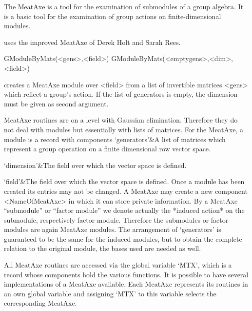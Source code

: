 

The MeatAxe \cite{Par84} is a tool for the examination of submodules of a
group algebra. It is a basic tool for the examination of group actions on
finite-dimensional modules.

{\GAP} uses the improved MeatAxe of Derek Holt and Sarah Rees.


\>GModuleByMats(<gens>,<field>)
\>GModuleByMats(<emptygens>,<dim>,<field>)

creates a MeatAxe module over <field> from a list of invertible matrices 
<gens> which reflect a group's action. If the list of generators is empty,
the dimension must be given as second argument.

MeatAxe routines are on a level with Gaussian elimination. Therefore they do
not deal with {\GAP} modules but essentially with lists of matrices. For the
MeatAxe, a module is a record with components
\beginitems
`generators'&A list of matrices which represent a group operation on a
finite dimensional row vector space.

`dimension'&The field over which the vector space is defined.

`field'&The field over which the vector space is defined.
\enditems
Once a module has been created its entries may not be changed. A MeatAxe may
create a new component <NameOfMeatAxe> in which it can store private
information. By a MeatAxe ``submodule'' or ``factor module'' we denote
actually the *induced action* on the submodule, respectively factor module.
Therefore the submodules or factor modules are again MeatAxe modules. The
arrangement of `generators' is guaranteed to be the same for the induced
modules, but to obtain the complete relation to the original module, the
bases used are needed as well.


All MeatAxe routines are accessed via the global variable `MTX', which is a
record whose components hold the various functions. It is possible to have
several implementations of a MeatAxe available. Each MeatAxe represents its
routines in an own global variable and assigning `MTX' to this variable
selects the corresponding MeatAxe.

